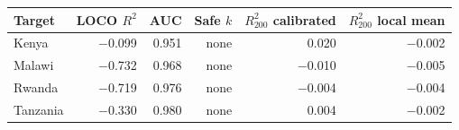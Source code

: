 \begin{tabular}{@{}lrrrrr@{}}
\toprule
Target & LOCO $R^2$ & AUC & Safe $k$ & $R^2_{200}$ calibrated & $R^2_{200}$ local mean \\
\midrule
Kenya & $-$0.099 & 0.951 & none & 0.020 & $-$0.002 \\
Malawi & $-$0.732 & 0.968 & none & $-$0.010 & $-$0.005 \\
Rwanda & $-$0.719 & 0.976 & none & $-$0.004 & $-$0.004 \\
Tanzania & $-$0.330 & 0.980 & none & 0.004 & $-$0.002 \\
\bottomrule
\end{tabular}
